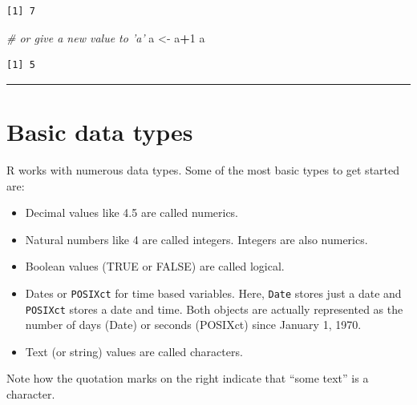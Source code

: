 \documentclass[
]{book}
\newenvironment{Shaded}{\begin{snugshade}}{\end{snugshade}}
\newcommand{\CommentTok}[1]{\textcolor[rgb]{0.56,0.35,0.01}{\textit{#1}}}
\newcommand{\DecValTok}[1]{\textcolor[rgb]{0.00,0.00,0.81}{#1}}
\newcommand{\FloatTok}[1]{\textcolor[rgb]{0.00,0.00,0.81}{#1}}
\newcommand{\KeywordTok}[1]{\textcolor[rgb]{0.13,0.29,0.53}{\textbf{#1}}}
\newcommand{\NormalTok}[1]{#1}
\newcommand{\OperatorTok}[1]{\textcolor[rgb]{0.81,0.36,0.00}{\textbf{#1}}}
\newcommand{\OtherTok}[1]{\textcolor[rgb]{0.56,0.35,0.01}{#1}}
\newcommand{\StringTok}[1]{\textcolor[rgb]{0.31,0.60,0.02}{#1}}
\providecommand{\tightlist}{%
  \setlength{\itemsep}{0pt}\setlength{\parskip}{0pt}}
\begin{document}
\begin{verbatim}
[1] 7
\end{verbatim}

\begin{Shaded}
\begin{Highlighting}[]
\CommentTok{# or give a new value to 'a'}
\NormalTok{a <-}\StringTok{ }\NormalTok{a}\OperatorTok{+}\DecValTok{1}
\NormalTok{a}
\end{Highlighting}
\end{Shaded}

\begin{verbatim}
[1] 5
\end{verbatim}

\begin{center}\rule{0.5\linewidth}{0.5pt}\end{center}

\hypertarget{basic-data-types}{%
\section{Basic data types}\label{basic-data-types}}

R works with numerous data types. Some of the most basic types to get started are:

\begin{itemize}
\tightlist
\item
  Decimal values like 4.5 are called numerics.
\item
  Natural numbers like 4 are called integers. Integers are also numerics.
\item
  Boolean values (TRUE or FALSE) are called logical.
\item
  Dates or \texttt{POSIXct} for time based variables. Here, \texttt{Date} stores just a date and \texttt{POSIXct} stores a date and time. Both objects are actually represented as the number of days (Date) or seconds (POSIXct) since January 1, 1970.
\item
  Text (or string) values are called characters.
\end{itemize}

Note how the quotation marks on the right indicate that ``some text'' is a character.

\begin{Shaded}
\end{Shaded}
\end{document}
